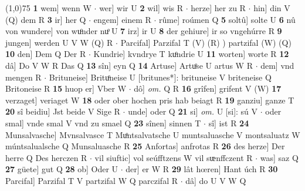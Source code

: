 \documentclass[8pt,a4paper,notitlepage]{article}
\begin{document}
\begin{table}[ht]
\begin{minipage}[t]{0.5\linewidth}
\line(1,0){75} \newline
\textbf{1} wem] wenn W  $\cdot$ wer] wir U \textbf{2} wil] wis R  $\cdot$ herze] her zu R  $\cdot$ hin] din V (Q) dem R \textbf{3} ir] her Q  $\cdot$ engem] einem R  $\cdot$ rûme] roúmen Q \textbf{5} soltû] solte U \textbf{6} nû von wundere] von wuͦnder nuͦ U \textbf{7} irz] ir U \textbf{8} der gehiure] ir so vngehúrre R \textbf{9} jungen] werden U V W (Q) R  $\cdot$ Parcifal] Parzifal T (V) (R) ) partzifal (W) (Q) \textbf{10} den] Dem Q Der R  $\cdot$ Kundrie] kvndrye T kuͦndrie U \textbf{11} worten] worte R \textbf{12} dâ] Do V W R Das Q \textbf{13} sîn] eyn Q \textbf{14} Artuse] Artuͦse U artus W R  $\cdot$ dem] vnd mengen R  $\cdot$ Brituneise] Brituͦneise U [britunes*]: brituneise V briteneise Q Britoneise R \textbf{15} huop er] Vber W  $\cdot$ dô] \textit{om.} Q R \textbf{16} grîfen] grifent V (W) \textbf{17} verzaget] veriaget W \textbf{18} oder ober hochen pris hab beiagt R \textbf{19} ganziu] ganze T \textbf{20} sî beidiu] Jst beide V Sige R  $\cdot$ unde] oder Q \textbf{21} si] \textit{om.} U [si]: sú V  $\cdot$ oder smal] vnde smal V vnd zu smael Q \textbf{23} sînen] sinnen T  $\cdot$ sî] ist R \textbf{24} Munsalvasche] Mvnsalvasce T Muͦntsalvatsche U muntsaluasche V montsaluatz W múntsalualsche Q Munsaluasche R \textbf{25} Anfortas] anfrotas R \textbf{26} des herze] Der herre Q Des herczen R  $\cdot$ vil siuftic] vol seúfftzens W vil sᵫnffczent R  $\cdot$ was] saz Q \textbf{27} güete] gut Q \textbf{28} ob] Oder U  $\cdot$ der] er W R \textbf{29} lât hœren] Hant úch R \textbf{30} Parcifal] Parzifal T V partzifal W Q parczifal R  $\cdot$ dâ] do U V W Q \newline
\end{minipage}
\end{table}
\end{document}
